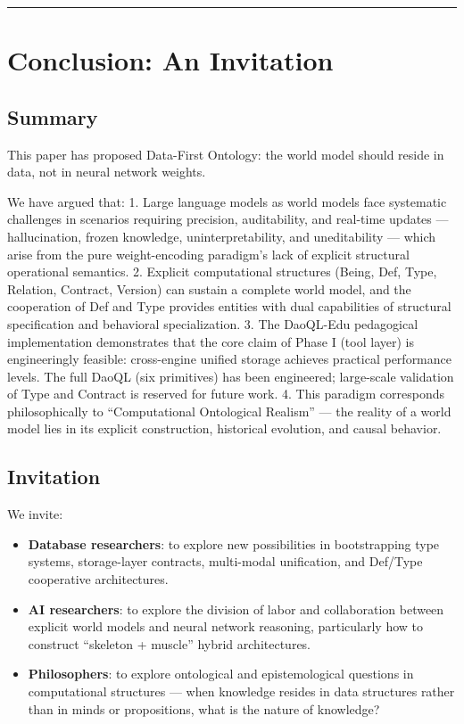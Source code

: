 \documentclass[11pt,a4paper]{article}
\begin{document}
\begin{center}\rule{0.5\linewidth}{0.5pt}\end{center}

\section{Conclusion: An
Invitation}\label{conclusion-an-invitation}

\subsection{Summary}\label{summary}

This paper has proposed Data-First Ontology: the world model should
reside in data, not in neural network weights.

We have argued that: 1. Large language models as world models face
systematic challenges in scenarios requiring precision, auditability,
and real-time updates --- hallucination, frozen knowledge,
uninterpretability, and uneditability --- which arise from the pure
weight-encoding paradigm's lack of explicit structural operational
semantics. 2. Explicit computational structures (Being, Def, Type,
Relation, Contract, Version) can sustain a complete world model, and the
cooperation of Def and Type provides entities with dual capabilities of
structural specification and behavioral specialization. 3. The DaoQL-Edu
pedagogical implementation demonstrates that the core claim of Phase I
(tool layer) is engineeringly feasible: cross-engine unified storage
achieves practical performance levels. The full DaoQL (six primitives)
has been engineered; large-scale validation of Type and Contract is
reserved for future work. 4. This paradigm corresponds philosophically
to ``Computational Ontological Realism'' --- the reality of a world
model lies in its explicit construction, historical evolution, and
causal behavior.

\subsection{Invitation}\label{invitation}

We invite:

\begin{itemize}
\tightlist
\item
  \textbf{Database researchers}: to explore new possibilities in
  bootstrapping type systems, storage-layer contracts, multi-modal
  unification, and Def/Type cooperative architectures.
\item
  \textbf{AI researchers}: to explore the division of labor and
  collaboration between explicit world models and neural network
  reasoning, particularly how to construct ``skeleton + muscle'' hybrid
  architectures.
\item
  \textbf{Philosophers}: to explore ontological and epistemological
  questions in computational structures --- when knowledge resides in
  data structures rather than in minds or propositions, what is the
  nature of knowledge?
\end{itemize}
\end{document}
